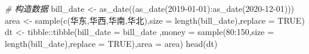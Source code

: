 \documentclass[
]{book}
\newenvironment{Shaded}{\begin{snugshade}}{\end{snugshade}}
\newcommand{\AttributeTok}[1]{\textcolor[rgb]{0.77,0.63,0.00}{#1}}
\newcommand{\CommentTok}[1]{\textcolor[rgb]{0.56,0.35,0.01}{\textit{#1}}}
\newcommand{\ConstantTok}[1]{\textcolor[rgb]{0.00,0.00,0.00}{#1}}
\newcommand{\DecValTok}[1]{\textcolor[rgb]{0.00,0.00,0.81}{#1}}
\newcommand{\FunctionTok}[1]{\textcolor[rgb]{0.00,0.00,0.00}{#1}}
\newcommand{\NormalTok}[1]{#1}
\newcommand{\OtherTok}[1]{\textcolor[rgb]{0.56,0.35,0.01}{#1}}
\newcommand{\SpecialCharTok}[1]{\textcolor[rgb]{0.00,0.00,0.00}{#1}}
\newcommand{\StringTok}[1]{\textcolor[rgb]{0.31,0.60,0.02}{#1}}
\begin{document}
\begin{Shaded}
\begin{Highlighting}[]
\CommentTok{\# 构造数据}
\NormalTok{bill\_date }\OtherTok{\textless{}{-}} \FunctionTok{as\_date}\NormalTok{((}\FunctionTok{as\_date}\NormalTok{(}\StringTok{\textquotesingle{}2019{-}01{-}01\textquotesingle{}}\NormalTok{)}\SpecialCharTok{:}\FunctionTok{as\_date}\NormalTok{(}\StringTok{\textquotesingle{}2020{-}12{-}01\textquotesingle{}}\NormalTok{)))}
\NormalTok{area }\OtherTok{\textless{}{-}}  \FunctionTok{sample}\NormalTok{(}\FunctionTok{c}\NormalTok{(}\StringTok{\textquotesingle{}华东\textquotesingle{}}\NormalTok{,}\StringTok{\textquotesingle{}华西\textquotesingle{}}\NormalTok{,}\StringTok{\textquotesingle{}华南\textquotesingle{}}\NormalTok{,}\StringTok{\textquotesingle{}华北\textquotesingle{}}\NormalTok{),}\AttributeTok{size =} \FunctionTok{length}\NormalTok{(bill\_date),}\AttributeTok{replace =} \ConstantTok{TRUE}\NormalTok{)}
\NormalTok{dt }\OtherTok{\textless{}{-}}\NormalTok{ tibble}\SpecialCharTok{::}\FunctionTok{tibble}\NormalTok{(}\AttributeTok{bill\_date =}\NormalTok{ bill\_date ,}\AttributeTok{money =} \FunctionTok{sample}\NormalTok{(}\DecValTok{80}\SpecialCharTok{:}\DecValTok{150}\NormalTok{,}\AttributeTok{size =} \FunctionTok{length}\NormalTok{(bill\_date),}\AttributeTok{replace =} \ConstantTok{TRUE}\NormalTok{),}\AttributeTok{area =}\NormalTok{ area)}
\FunctionTok{head}\NormalTok{(dt)}
\end{Highlighting}
\end{Shaded}
\end{document}
